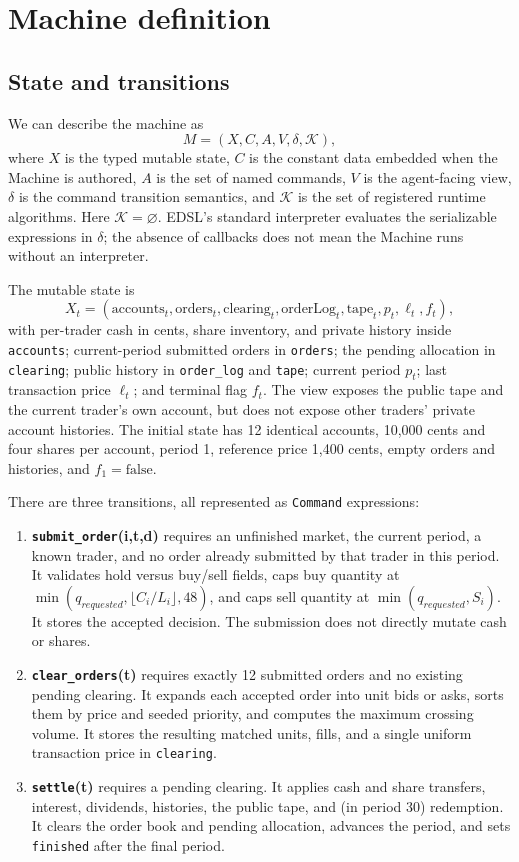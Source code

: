 \documentclass[11pt]{article}
\newcommand{\code}[1]{\texttt{\small #1}}
\begin{document}
\section{Machine definition}
\subsection{State and transitions}
We can describe the machine as
\[
  M=(X, C, A, V, \delta, \mathcal{K}),
\]
where \(X\) is the typed mutable state, \(C\) is the constant data embedded
when the Machine is authored, \(A\) is the set of named commands, \(V\) is the
agent-facing view, \(\delta\) is the command transition semantics, and
\(\mathcal{K}\) is the set of registered runtime algorithms. Here
\(\mathcal{K}=\varnothing\). EDSL's standard interpreter evaluates the
serializable expressions in \(\delta\); the absence of callbacks does not mean
the Machine runs without an interpreter.

The mutable state is
\[
X_t=(\text{accounts}_t,\text{orders}_t,\text{clearing}_t,
\text{orderLog}_t,\text{tape}_t, p_t, \ell_t, f_t),
\]
with per-trader cash in cents, share inventory, and private history inside
\code{accounts}; current-period submitted orders in \code{orders}; the pending
allocation in \code{clearing}; public history in \code{order\_log} and
\code{tape}; current period \(p_t\); last transaction price \(\ell_t\); and
terminal flag \(f_t\). The view exposes the public tape and the current trader's
own account, but does not expose other traders' private account histories.
The initial state has 12 identical accounts, 10,000 cents and four shares per
account, period 1, reference price 1,400 cents, empty orders and histories, and
\(f_1=\text{false}\).

There are three transitions, all represented as \code{Command} expressions:
\begin{enumerate}[leftmargin=2em,itemsep=2pt]
  \item \textbf{\code{submit\_order}(i,t,d)} requires an unfinished market, the
  current period, a known trader, and no order already submitted by that trader
  in this period. It validates hold versus buy/sell fields, caps buy quantity at
  \(\min(q_{requested},\lfloor C_i/L_i\rfloor,48)\), and caps sell quantity at
  \(\min(q_{requested},S_i)\). It stores the accepted decision. The submission
  does not directly mutate cash or shares.
  \item \textbf{\code{clear\_orders}(t)} requires exactly 12 submitted orders
  and no existing pending clearing. It expands each accepted order into unit
  bids or asks, sorts them by price and seeded priority, and computes the
  maximum crossing volume. It stores the resulting matched units, fills, and
  a single uniform transaction price in \code{clearing}.
  \item \textbf{\code{settle}(t)} requires a pending clearing. It applies cash
  and share transfers, interest, dividends, histories, the public tape, and
  (in period 30) redemption. It clears the order book and pending allocation,
  advances the period, and sets \code{finished} after the final period.
\end{enumerate}
\end{document}
